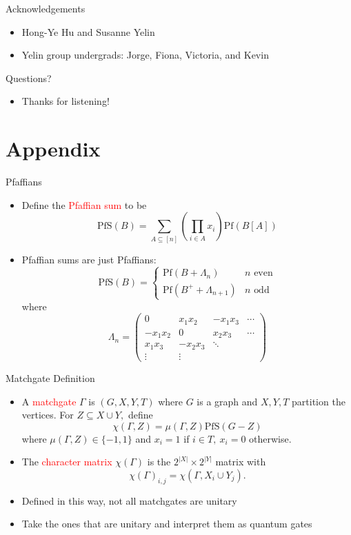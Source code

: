 \documentclass[xcolor=dvipsnames]{beamer}
\begin{document}
\begin{frame}{Acknowledgements}
  \begin{itemize}
    \item Hong-Ye Hu and Susanne Yelin  
    \item Yelin group undergrads: Jorge, Fiona, Victoria, and Kevin
  \end{itemize}
\end{frame}

\begin{frame}{Questions?}
  \begin{itemize}
    \item Thanks for listening!
  \end{itemize}
\end{frame}

\section{Appendix}
\begin{frame}{Pfaffians}
  \begin{itemize}
    \item Define the \textcolor{red}{Pfaffian sum} to be 
    \[\text{PfS}(B)=\sum_{A\subseteq [n]}\left(\prod_{i\in A}x_i\right)\text{Pf}(B[A])\]
    \item Pfaffian sums are just Pfaffians:
    \[\text{PfS}(B)=
    \begin{cases}
      \text{Pf}(B+\Lambda_n) & n\text{ even}\\
      \text{Pf}(B^++\Lambda_{n+1}) & n\text{ odd}
    \end{cases}\]
    where
    \[\Lambda_n=
    \begin{pmatrix}
      0 & x_1x_2 & -x_1x_3 & \cdots\\
      -x_1x_2 & 0 & x_2x_3 & \cdots\\
      x_1x_3 & -x_2x_3 & \ddots & \\
      \vdots & \vdots & & 
    \end{pmatrix}\]
  \end{itemize}
\end{frame}

\begin{frame}{Matchgate Definition}
  \begin{itemize}
    \item A \textcolor{red}{matchgate} $\Gamma$ is $(G,X,Y,T)$ where $G$ is a graph and $X,Y,T$ partition the vertices. For $Z\subseteq X\cup Y,$ define 
    \[\chi(\Gamma,Z)=\mu(\Gamma,Z)\text{PfS}(G-Z)\]
    where $\mu(\Gamma,Z)\in\{-1,1\}$ and $x_i=1$ if $i\in T,~x_i=0$ otherwise.
    \item The \textcolor{red}{character matrix} $\chi(\Gamma)$ is the $2^{|X|}\times 2^{|Y|}$ matrix with 
    \[\chi(\Gamma)_{i,j}=\chi(\Gamma,X_i\cup Y_j).\]
    \item Defined in this way, not all matchgates are unitary
    \item Take the ones that are unitary and interpret them as quantum gates
  \end{itemize}
  
\end{frame}
\end{document}
